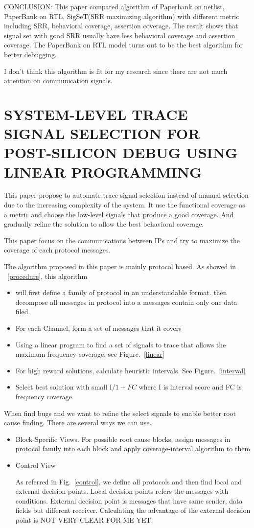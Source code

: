 \documentclass[conference]{IEEEtran}
\begin{document}
CONCLUSION: This paper compared algorithm of Paperbank on netlist, PaperBank on RTL, SigSeT(SRR maximizing algorithm) with different metric including SRR, behavioral coverage, assertion coverage. The result shows that signal set with good SRR usually have less behavioral coverage and assertion coverage. The PaperBank on RTL model turns out to be the best algorithm for better debugging. 

I don't think this algorithm is fit for my research since there are not much attention on communication signals. 




\section{SYSTEM-LEVEL TRACE SIGNAL SELECTION FOR POST-SILICON DEBUG USING LINEAR PROGRAMMING}
This paper propose to automate trace signal selection instead of manual selection due to the increasing complexity of the system. It use the functional coverage as a metric and choose the low-level signals that produce a good coverage. And gradually refine the solution to allow the best behavioral coverage. 

This paper focus on the communications between IPs and try to maximize the coverage of each protocol messages.

The algorithm proposed in this paper is mainly protocol based.  As showed in ~\ref{procedure}, this algorithm 
\begin{itemize}
\item will first define a family of protocol in an understandable format. then decompose all messages in protocol into a messages contain only one data filed. 
\item For each Channel, form a set of messages that it covers
\item Using a linear program to find a set of signals to trace that allows the maximum frequency coverage. see Figure.~\ref{linear}
\item For high reward solutions, calculate heuristic intervals. See Figure.~\ref{interval}
\item Select best solution with small I/\(1+FC\) where I is interval score and FC is frequency coverage.
\end{itemize}

When find bugs and we want to refine the select signals to enable better root cause finding. There are several ways we can use.
\begin{itemize}
\item Block-Specific Views. For possible root cause blocks, assign messages in protocol family into each block and apply coverage-interval algorithm to them
\item Control View

As referred in Fig.~\ref{control}, we define all protocols and then find local and external decision points. Local decision points refers the messages with conditions. External decision point is messages that have same sender, data fields but different receiver. Calculating the advantage of the external decision point is NOT VERY CLEAR FOR ME YET. 
\end{itemize}
\end{document}
